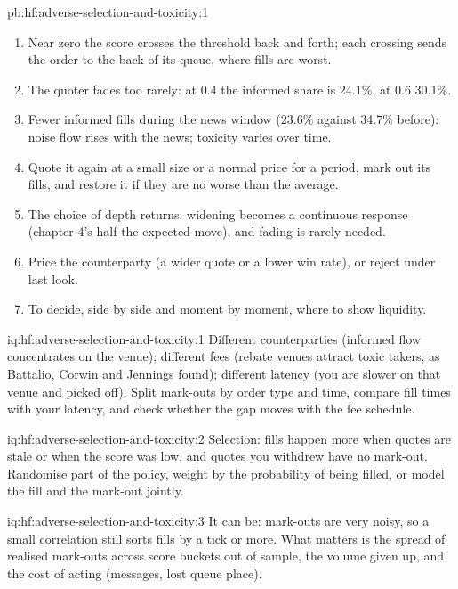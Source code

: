 \begin{solution}{pb:hf:adverse-selection-and-toxicity:1}
\begin{enumerate}
10\,733 shares a session: 44\% given up.
\item Near zero the score crosses the threshold back and forth; each crossing sends the order to the back of its queue, where fills are worst.
\item The quoter fades too rarely: at 0.4 the informed share is 24.1\%, at 0.6 30.1\%.
\item Fewer informed fills during the news window (23.6\% against 34.7\% before): noise flow rises with the news; toxicity varies over time.
\item Quote it again at a small size or a normal price for a period, mark out its fills, and restore it if they are no worse than the average.
\item The choice of depth returns: widening becomes a continuous response (chapter 4's half the expected move), and fading is rarely needed.
\item Price the counterparty (a wider quote or a lower win rate), or reject under last look.
\item To decide, side by side and moment by moment, where to show liquidity.
\end{enumerate}
\end{solution}

\begin{solution}{iq:hf:adverse-selection-and-toxicity:1}
Different counterparties (informed flow concentrates on the venue); different fees (rebate venues attract toxic takers, as Battalio, Corwin and
Jennings found); different latency (you are slower on that venue and picked off). Split mark-outs by order type and time, compare fill times with your
latency, and check whether the gap moves with the fee schedule.
\end{solution}

\begin{solution}{iq:hf:adverse-selection-and-toxicity:2}
Selection: fills happen more when quotes are stale or when the score was low, and quotes you withdrew have no mark-out. Randomise part of the
policy, weight by the probability of being filled, or model the fill and the mark-out jointly.
\end{solution}

\begin{solution}{iq:hf:adverse-selection-and-toxicity:3}
It can be: mark-outs are very noisy, so a small correlation still sorts fills by a tick or more. What matters is the spread of realised mark-outs
across score buckets out of sample, the volume given up, and the cost of acting (messages, lost queue place).
\end{solution}

